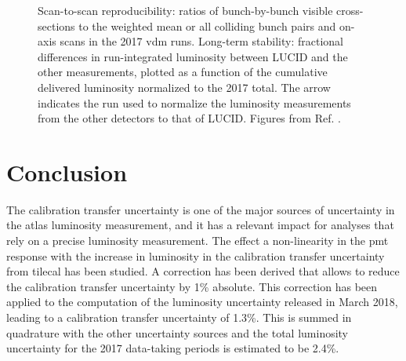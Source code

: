 \begin{figure}[htbp]
\centering
{}
\caption{ Scan-to-scan reproducibility: 
ratios of bunch-by-bunch visible cross-sections to the weighted mean or all colliding bunch pairs and on-axis scans in 
the 2017 \gls{vdm} runs. 
 Long-term stability: fractional differences 
in run-integrated luminosity between LUCID and the other measurements, plotted as a function of the cumulative delivered luminosity normalized to the 2017 total. 
The arrow indicates the run used to normalize the luminosity measurements from the other detectors to that of LUCID. 
Figures from Ref. \cite{ATLAS-CONF-2019-021}. 
}
\label{fig:apppmt:othersyst}
\end{figure}


\section{Conclusion}

The calibration transfer uncertainty is one of the major sources of uncertainty in the \gls{atlas} luminosity 
measurement, and it has a relevant impact for analyses that rely on a precise luminosity measurement. 
The effect a non-linearity in the \gls{pmt} response with the increase in luminosity in the calibration transfer uncertainty from 
\gls{tilecal} has been studied. 
A correction has been derived that allows to reduce the calibration transfer uncertainty by 1\% absolute.
This correction has been applied to the computation of the luminosity uncertainty released in March 2018, 
leading to a calibration transfer uncertainty of 1.3\%. 
This is summed in quadrature with the other uncertainty sources and 
the total luminosity uncertainty for the 2017 data-taking periods is estimated to be 2.4\%. 

\clearpage



